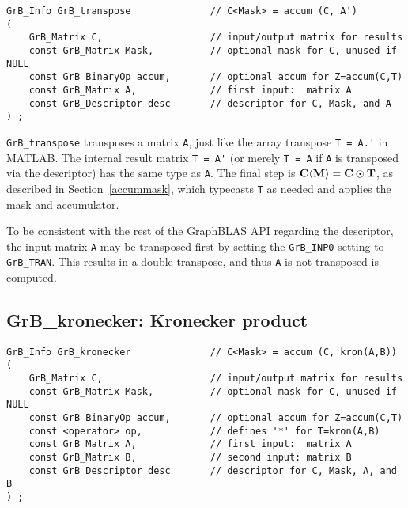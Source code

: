 \documentclass[12pt]{article}
\begin{document}
{\begin{mdframed}[userdefinedwidth=6in]
{\footnotesize
\begin{verbatim}
GrB_Info GrB_transpose              // C<Mask> = accum (C, A')
(
    GrB_Matrix C,                   // input/output matrix for results
    const GrB_Matrix Mask,          // optional mask for C, unused if NULL
    const GrB_BinaryOp accum,       // optional accum for Z=accum(C,T)
    const GrB_Matrix A,             // first input:  matrix A
    const GrB_Descriptor desc       // descriptor for C, Mask, and A
) ;
\end{verbatim} } \end{mdframed}

\verb'GrB_transpose'
transposes a matrix \verb'A', just like the array transpose \verb"T = A.'" in
MATLAB.  The internal result matrix \verb"T = A'" (or merely \verb"T = A" if
\verb'A' is transposed via the descriptor) has the same type as \verb'A'.  The
final step is ${\bf C \langle M \rangle  = C \odot T}$, as described in
Section~\ref{accummask}, which typecasts \verb'T' as needed and applies the
mask and accumulator.

To be consistent with the rest of the GraphBLAS API regarding the
descriptor, the input matrix \verb'A' may be transposed first by
setting the \verb'GrB_INP0' setting to \verb'GrB_TRAN'.  This results in
a double transpose, and thus \verb'A' is not transposed is computed.

\newpage
\subsection{{\sf GrB\_kronecker:} Kronecker product} %
\label{kron}

\begin{mdframed}[userdefinedwidth=6in]
{\footnotesize
\begin{verbatim}
GrB_Info GrB_kronecker              // C<Mask> = accum (C, kron(A,B))
(
    GrB_Matrix C,                   // input/output matrix for results
    const GrB_Matrix Mask,          // optional mask for C, unused if NULL
    const GrB_BinaryOp accum,       // optional accum for Z=accum(C,T)
    const <operator> op,            // defines '*' for T=kron(A,B)
    const GrB_Matrix A,             // first input:  matrix A
    const GrB_Matrix B,             // second input: matrix B
    const GrB_Descriptor desc       // descriptor for C, Mask, A, and B
) ;
\end{verbatim} } \end{mdframed}

}
\end{document}
